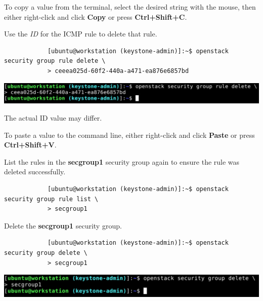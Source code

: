 \documentclass[letterpaper, 12pt]{article}
\begin{document}
\begin{enumerate}
    \begin{tipbox}
        To copy a value from the terminal, select the desired string with the mouse, then either right-click and click \textbf{Copy} or press \textbf{Ctrl+Shift+C}.
    \end{tipbox}

    \begin{labstep}
        Use the \textit{ID} for the ICMP rule to delete that rule.
        \begin{lstlisting}
            [ubuntu@workstation (keystone-admin)]:~$ openstack security group rule delete \
            > ceeea025d-60f2-440a-a471-ea876e6857bd
        \end{lstlisting}

        \begin{center}
            \includegraphics[width=\linewidth]{images/part5/step9.png}
        \end{center}
    \end{labstep}

    \begin{notebox}
        The actual ID value may differ.
    \end{notebox}
    \begin{tipbox}
        To paste a value to the command line, either right-click and click \textbf{Paste} or press \textbf{Ctrl+Shift+V}.
    \end{tipbox}

    \begin{labstep}
        List the rules in the \textbf{secgroup1} security group again to ensure the rule was deleted successfully.
        \begin{lstlisting}
            [ubuntu@workstation (keystone-admin)]:~$ openstack security group rule list \
            > secgroup1
        \end{lstlisting}
    \end{labstep}

    \begin{labstep}
        Delete the \textbf{secgroup1} security group.
        \begin{lstlisting}
            [ubuntu@workstation (keystone-admin)]:~$ openstack security group delete \
            > secgroup1
        \end{lstlisting}

        \begin{center}
            \includegraphics[width=\linewidth]{images/part5/step11.png}
        \end{center}
    \end{labstep}


\end{enumerate}
\end{document}
